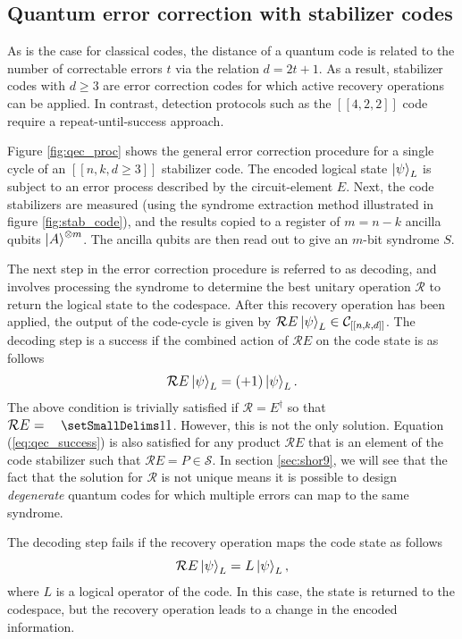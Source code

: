 \documentclass[]{arxiv}
\theoremstyle{plain}%
\theoremstyle{definition}
\theoremstyle{remark}
\DeclareRobustCommand\openone{\leavevmode\hbox{\small1\normalsize\kern-.33em1}}
\begin{document}
\subsection{Quantum error correction with stabilizer codes} \label{sec:qec_proc}
As is the case for classical codes, the distance of a quantum code is related to the number of correctable errors $t$ via the relation $d=2t+1$. As a result, stabilizer codes with $d \geq 3$ are error correction codes for which active recovery operations can be applied. In contrast, detection protocols such as the $[[4,2,2]]$ code require a repeat-until-success approach.

Figure \ref{fig:qec_proc} shows the general error correction procedure for a single cycle of an $[[n,k,d\geq3]]$ stabilizer code. The encoded logical state $\ket{\psi}_L$ is subject to an error process described by the circuit-element $E$. Next, the code stabilizers are measured (using the syndrome extraction method illustrated in figure \ref{fig:stab_code}), and the results copied to a register of $m=n-k$ ancilla qubits $\ket{A}^{\otimes m}$. The ancilla qubits are then read out to give an $m$-bit syndrome $S$.

The next step in the error correction procedure is referred to as decoding, and involves processing the syndrome to determine the best unitary operation $\mathcal{R}$ to return the logical state to the codespace. After this recovery operation has been applied, the output of the code-cycle is given by $
\mathcal{R}E\ket{\psi}_L \in \mathcal{C}_{[[n,k,d]]}$. The decoding step is a success if the combined action of $\mathcal{R}E$ on the code state is as follows 
%
\begin{equation}\label{eq:qec_success}
\mathcal{R}E\ket{\psi}_L=(+1)\ket{\psi}_L\rm.
\end{equation}
%
The above condition is trivially satisfied if $\mathcal{R}=E^\dagger$ so that $\mathcal{R}E=\openone$. However, this is not the only solution. Equation (\ref{eq:qec_success}) is also satisfied for any product $\mathcal{R}E$ that is an element of the code stabilizer such that $\mathcal{R}E=P\in \mathcal{S}$. In section \ref{sec:shor9}, we will see that the fact that the solution for $\mathcal{R}$ is not unique means it is possible to design \textit{degenerate} quantum codes for which multiple errors can map to the same syndrome.

The decoding step fails if the recovery operation maps the code state as follows
%
\begin{equation}
\mathcal{R}E\ket{\psi}_L=L\ket{\psi}_L\rm,
\end{equation}
%
where $L$ is a logical operator of the code. In this case, the state is returned to the codespace, but the recovery operation leads to a change in the encoded information.    
\end{document}
